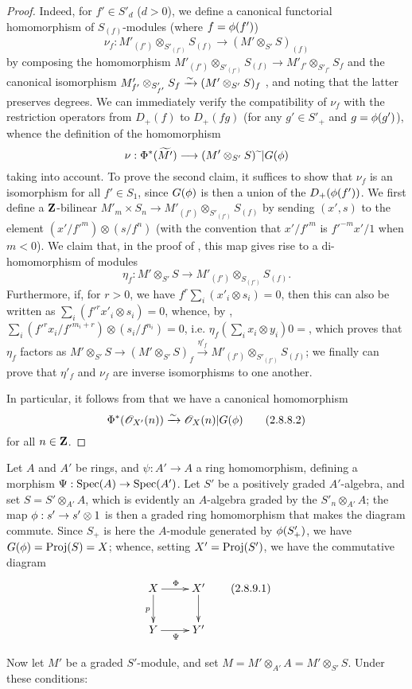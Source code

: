 \begin{proof}
Indeed, for $f'\in S'_d$ ($d>0$), we define a canonical functorial homomorphism of $S_{(f)}$-modules (where $f=\phi(f')$)
\[
\label{II.2.8.8.1}
  \nu_f: M'_{(f')}\otimes_{S'_{(f')}}S_{(f)} \to (M'\otimes_{S'}S)_{(f)}
\tag{2.8.8.1}
\]
by composing the homomorphism $M'_{(f')}\otimes_{S'_{(f')}}S_{(f)}\to M'_{f'}\otimes_{S'_{f'}}S_f$ and the canonical isomorphism $M'_{f'}\otimes_{S'_{f'}}S_f\xrightarrow{\sim}(M'\otimes_{S'}S)_f$ , and noting that the latter preserves degrees.
We can immediately verify the compatibility of $\nu_f$ with the restriction operators from $D_+(f)$ to $D_+(fg)$ (for any $g'\in S'_+$ and $g=\phi(g')$), whence the definition of the homomorphism
\[
  \nu: \Phi^*(\widetilde{M'}) \to (M'\otimes_{S'}S)\supertilde|G(\vphi)
\]
taking  into account.
To prove the second claim, it suffices to show that $\nu_f$ is an isomorphism for all $f'\in S_1$, since $G(\phi)$ is then a union of the $D_+(\phi(f'))$.
We first define a $\mathbf{Z}$-bilinear $M'_m\times S_n\to M'_{(f')}\otimes_{S'_{(f')}}S_{(f)}$ by sending $(x',s)$ to the element $(x'/{f'}^m)\otimes(s/f^n)$ (with the convention that $x'/{f'}^m$ is ${f'}^{-m}x'/1$ when $m<0$).
We claim that, in the proof of , this map gives rise to a di-homomorphism of modules
\[
  \eta_f: M'\otimes_{S'}S \to M'_{(f')}\otimes_{S_{(f')}}S_{(f)}.
\]
Furthermore, if, for $r>0$, we have $f^r\sum_i(x'_i\otimes s_i)=0$, then this can also be written as $\sum_i({f'}^rx'_i\otimes s_i)=0$, whence, by , $\sum_i({f'}^rx_i/{f'}^{m_i+r})\otimes(s_i/f^{n_i})=0$, i.e. $\eta_f(\sum_i x_i\otimes y_i)0=$, which proves that $\eta_f$ factors as $M'\otimes_{S'}S\to(M'\otimes_{S'}S)_f\xrightarrow{\eta'_f}M'_{(f')}\otimes_{S'_{(f')}}S_{(f)}$;
we finally can prove that $\eta'_f$ and $\nu_f$ are inverse isomorphisms to one another.

In particular, it follows from  that we have a canonical homomorphism
\[
\label{II.2.8.8.2}
  \Phi^*(\mathscr{O}_{X'}(n)) \xrightarrow{\sim} \mathscr{O}_X(n)|G(\phi)
\tag{2.8.8.2}
\]
for all $n\in\mathbf{Z}$.
\end{proof}

\begin{env}[2.8.9]
\label{II.2.8.9}
Let $A$ and $A'$ be rings, and $\psi:A'\to A$ a ring homomorphism, defining a morphism $\Psi:\Spec(A)\to\Spec(A')$.
Let $S'$ be a positively graded $A'$-algebra, and set $S=S'\otimes_{A'}A$, which is evidently an $A$-algebra graded by the $S'_n\otimes_{A'}A$;
the map $\vphi:s'\to s'\otimes1$ is then a graded ring homomorphism that makes the diagram  commute.
Since $S_+$ is here the $A$-module generated by $\phi(S'_+)$, we have $G(\phi)=\operatorname{Proj}(S)=X$;
whence, setting $X'=\operatorname{Proj}(S')$, we have the commutative diagram
\[
\label{II.2.8.9.1}
  \xymatrix{
    X \ar[r]^{\Phi} \ar[d]_p
    & X' \ar[d]
  \\Y \ar[r]_{\Psi}
    & Y'
  }
\tag{2.8.9.1}
\]

Now let $M'$ be a graded $S'$-module, and set $M=M'\otimes_{A'}A=M'\otimes_{S'}S$.
Under these conditions:
\end{env}

